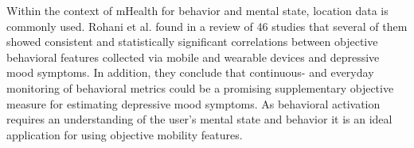 Within the context of mHealth for behavior and mental state, location data is commonly used. Rohani et al. \cite{rohani2018-correlations} found in a review of 46 studies that several of them showed consistent and statistically significant correlations between objective behavioral features collected via mobile and wearable devices and depressive mood symptoms. In addition, they conclude that continuous- and everyday monitoring of behavioral metrics could be a promising supplementary objective measure for estimating depressive mood symptoms. As behavioral activation requires an understanding of the user's mental state and behavior it is an ideal application for using objective mobility features. \\


